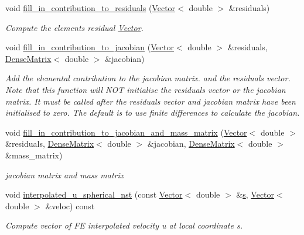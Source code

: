 \begin{DoxyCompactItemize}
\item 
void \hyperlink{classoomph_1_1SphericalNavierStokesEquations_a579d10e44c68adb34f72ca8ec89b7b1a}{fill\+\_\+in\+\_\+contribution\+\_\+to\+\_\+residuals} (\hyperlink{classoomph_1_1Vector}{Vector}$<$ double $>$ \&residuals)
\begin{DoxyCompactList}\small\item\em Compute the element\textquotesingle{}s residual \hyperlink{classoomph_1_1Vector}{Vector}. \end{DoxyCompactList}\item 
void \hyperlink{classoomph_1_1SphericalNavierStokesEquations_a518de36d4b06dcd38ab7e18a89f40e9f}{fill\+\_\+in\+\_\+contribution\+\_\+to\+\_\+jacobian} (\hyperlink{classoomph_1_1Vector}{Vector}$<$ double $>$ \&residuals, \hyperlink{classoomph_1_1DenseMatrix}{Dense\+Matrix}$<$ double $>$ \&jacobian)
\begin{DoxyCompactList}\small\item\em Add the elemental contribution to the jacobian matrix. and the residuals vector. Note that this function will N\+OT initialise the residuals vector or the jacobian matrix. It must be called after the residuals vector and jacobian matrix have been initialised to zero. The default is to use finite differences to calculate the jacobian. \end{DoxyCompactList}\item 
void \hyperlink{classoomph_1_1SphericalNavierStokesEquations_acc7eab4a9151a3bda8ca0056c5a38137}{fill\+\_\+in\+\_\+contribution\+\_\+to\+\_\+jacobian\+\_\+and\+\_\+mass\+\_\+matrix} (\hyperlink{classoomph_1_1Vector}{Vector}$<$ double $>$ \&residuals, \hyperlink{classoomph_1_1DenseMatrix}{Dense\+Matrix}$<$ double $>$ \&jacobian, \hyperlink{classoomph_1_1DenseMatrix}{Dense\+Matrix}$<$ double $>$ \&mass\+\_\+matrix)
\begin{DoxyCompactList}\small\item\em jacobian matrix and mass matrix \end{DoxyCompactList}\item 
void \hyperlink{classoomph_1_1SphericalNavierStokesEquations_af59a7941f1ac3c2b3bc9a8aacbfa4625}{interpolated\+\_\+u\+\_\+spherical\+\_\+nst} (const \hyperlink{classoomph_1_1Vector}{Vector}$<$ double $>$ \&\hyperlink{cfortran_8h_ab7123126e4885ef647dd9c6e3807a21c}{s}, \hyperlink{classoomph_1_1Vector}{Vector}$<$ double $>$ \&veloc) const
\begin{DoxyCompactList}\small\item\em Compute vector of FE interpolated velocity u at local coordinate s. \end{DoxyCompactList}\item 

\end{DoxyCompactItemize}
